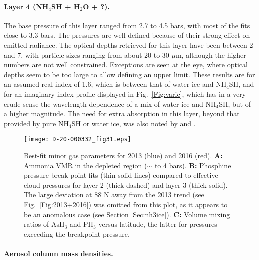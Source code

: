 \documentclass[article,11pt]{emulateapj}
\def\asht{AsH$_3$ }
\def\hto{H$_2$O }
\def\degx{$^\circ$}
\def\mumx{$\mu$m}
\def\hto{H$_2$O }
\def\pht{PH$_3$ }
\def\nhfsh{NH$_4$SH }
\def\nhfshx{NH$_4$SH}
\begin{document}
\paragraph{Layer 4 (\nhfsh + \hto + ?).} The base pressure of this layer ranged
 from 2.7 to 4.5 bars, with most of the
fits close to 3.3 bars.  The pressures are well defined because of their
strong effect on emitted radiance.  The optical depths retrieved for this
layer have been between 2 and 7, with particle sizes ranging from
about 20 to 30 \mumx, although the higher numbers are not well
constrained.  Exceptions are seen at the eye, where optical depths
seem to be too large to allow defining an upper limit.  These results
are for an assumed real index of 1.6, which is between that of water
ice and \nhfshx, and for an imaginary index profile displayed in
Fig.\ \ref{Fig:varic}, which has in a very crude sense the wavelength
dependence of a mix of water ice and \nhfshx, but of a higher
magnitude.  The need for extra absorption in this layer, beyond that
provided by pure \nhfsh or water ice, was also
noted by \cite{Barstow2016} and \cite{Sro2020spole}.

\begin{figure}[!ht]\centering
\texttt{[image: D-20-000332\_fig31.eps]}
\caption{Best-fit minor gas parameters for 2013 (blue) and  2016 (red). {\bf A:} Ammonia VMR in
the depleted region ($\sim$ to 4 bars).  {\bf B:} Phosphine
pressure break point fits (thin solid lines) compared to effective cloud pressures for layer 2 (thick dashed)
and layer 3 (thick solid). The large deviation at 88\degx N away from the 2013 trend (see Fig.\ \ref{Fig:2013+2016})
was omitted from this plot, as it  appears to be an anomalous case (see Section \ref{Sec:nh3ice}).
 {\bf C:} Volume mixing ratios of \asht and \pht versus latitude, the latter for pressures exceeding the breakpoint 
pressure.}\label{Fig:gasfits}
\end{figure}


\paragraph{Aerosol column mass densities. }
\end{document}
